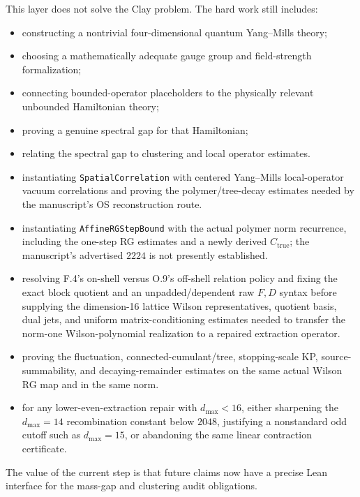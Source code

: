 \documentclass[11pt]{article}
\newcommand{\lean}[1]{\texttt{#1}}
\begin{document}
This layer does not solve the Clay problem.  The hard work still includes:
\begin{itemize}[leftmargin=1.5em]
  \item constructing a nontrivial four-dimensional quantum Yang--Mills theory;
  \item choosing a mathematically adequate gauge group and field-strength
    formalization;
  \item connecting bounded-operator placeholders to the physically relevant
    unbounded Hamiltonian theory;
  \item proving a genuine spectral gap for that Hamiltonian;
  \item relating the spectral gap to clustering and local operator estimates.
  \item instantiating \lean{SpatialCorrelation} with centered Yang--Mills
    local-operator vacuum correlations and proving the polymer/tree-decay
    estimates needed by the manuscript's OS reconstruction route.
  \item instantiating \lean{AffineRGStepBound} with the actual polymer norm
    recurrence, including the one-step RG estimates and a newly derived
    \(C_{\mathrm{true}}\); the manuscript's advertised \(2224\) is not presently
    established.
  \item resolving F.4's on-shell versus O.9's off-shell relation policy and
    fixing the exact block quotient and an unpadded/dependent raw \(F,D\)
    syntax before supplying the dimension-16 lattice Wilson representatives,
    quotient basis, dual jets, and uniform matrix-conditioning estimates
    needed to transfer the norm-one Wilson-polynomial realization to a
    repaired extraction operator.
  \item proving the fluctuation, connected-cumulant/tree, stopping-scale KP,
    source-summability, and decaying-remainder estimates on the same actual
    Wilson RG map and in the same norm.
  \item for any lower-even-extraction repair with \(d_{\max}<16\), either
    sharpening the \(d_{\max}=14\) recombination constant below \(2048\),
    justifying a nonstandard odd cutoff such as \(d_{\max}=15\), or abandoning
    the same linear contraction certificate.
\end{itemize}

The value of the current step is that future claims now have a precise Lean
interface for the mass-gap and clustering audit obligations.
\end{document}
